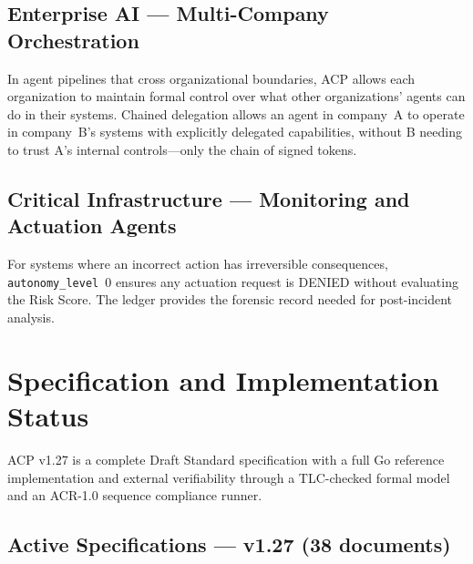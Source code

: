 \documentclass[11pt]{article}
\theoremstyle{definition}
\begin{document}
\subsection{Enterprise AI --- Multi-Company Orchestration}

In agent pipelines that cross organizational boundaries,
ACP allows each organization to maintain formal control over what other organizations' agents can do in their systems.
Chained delegation allows an agent in company~A to operate in company~B's systems with explicitly delegated capabilities,
without B needing to trust A's internal controls---only the chain of signed tokens.

\subsection{Critical Infrastructure --- Monitoring and Actuation Agents}

For systems where an incorrect action has irreversible consequences,
\texttt{autonomy\_level}~0 ensures any actuation request is DENIED without evaluating the Risk Score.
The ledger provides the forensic record needed for post-incident analysis.

\section{Specification and Implementation Status}

ACP v1.27 is a complete Draft Standard specification with a full Go reference implementation
and external verifiability through a TLC-checked formal model and an ACR-1.0 sequence compliance runner.

\subsection{Active Specifications --- v1.27 (38 documents)}
\end{document}

